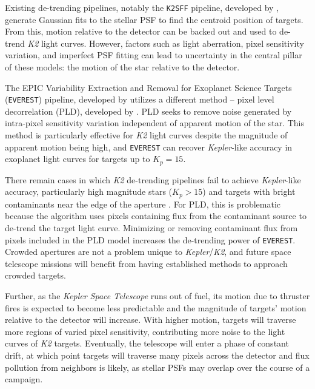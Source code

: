 \documentclass[12pt,preprint]{emulateapj}
\begin{document}
Existing de-trending pipelines, notably the \texttt{K2SFF} pipeline, developed by \cite{2014PASP..126..948V}, generate Gaussian fits to the stellar PSF to find the centroid position of targets. From this, motion relative to the detector can be backed out and used to de-trend \textit{K2} light curves. However, factors such as light aberration, pixel sensitivity variation, and imperfect PSF fitting can lead to uncertainty in the central pillar of these models: the motion of the star relative to the detector.

The EPIC Variability Extraction and Removal for Exoplanet Science Targets (\texttt{EVEREST}) pipeline, developed by \cite{2016AJ....152..100L, 2017arXiv170205488L} utilizes a different method -- pixel level decorrelation (PLD), developed by \cite{0004-637X-805-2-132}. PLD seeks to remove noise generated by intra-pixel sensitivity variation independent of apparent motion of the star. This method is particularly effective for \textit{K2} light curves despite the magnitude of apparent motion being high, and \texttt{EVEREST} can recover \textit{Kepler}-like accuracy in exoplanet light curves for targets up to $K_p = 15$.

There remain cases in which \textit{K2} de-trending pipelines fail to achieve \textit{Kepler}-like accuracy, particularly high magnitude stars ($K_p > 15$) and targets with bright contaminants near the edge of the aperture \citep{2017arXiv170205488L}. For PLD, this is problematic because the algorithm uses pixels containing flux from the contaminant source to de-trend the target light curve. Minimizing or removing contaminant flux from pixels included in the PLD model increases the de-trending power of \texttt{EVEREST}. Crowded apertures are not a problem unique to \textit{Kepler}/\textit{K2}, and future space telescope missions will benefit from having established methods to approach crowded targets.

Further, as the \textit{Kepler Space Telescope} runs out of fuel, its motion due to thruster fires is expected to become less predictable and the magnitude of targets' motion relative to the detector will increase. With higher motion, targets will traverse more regions of varied pixel sensitivity, contributing more noise to the light curves of \textit{K2} targets. Eventually, the telescope will enter a phase of constant drift, at which point targets will traverse many pixels across the detector and flux pollution from neighbors is likely, as stellar PSFs may overlap over the course of a campaign.
\end{document}
